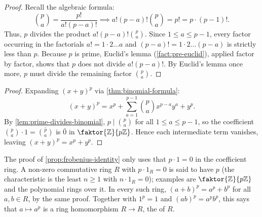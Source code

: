 \begin{content}

\begin{proof}
Recall the algebraic formula:
\[
\binom{p}{a} = \frac{p!}{a! (p-a)!} \implies a! (p-a)! \binom{p}{a} = p! = p \cdot (p-1)!.
\]
Thus, $p$ divides the product $a! (p-a)! \binom{p}{a}$. Since $1 \le a \le p-1$, every factor occurring in the factorials $a! = 1 \cdot 2 \dots a$ and $(p-a)! = 1 \cdot 2 \dots (p-a)$ is strictly less than $p$. Because $p$ is prime, Euclid's lemma (\cref{fact:pre-euclid}), applied factor by factor, shows that $p$ does not divide $a! (p-a)!$. By Euclid's lemma once more, $p$ must divide the remaining factor $\binom{p}{a}$.
\end{proof}


\begin{proof}
Expanding $(x + y)^p$ via \cref{thm:binomial-formula}:
\[
(x + y)^p = x^p + \sum_{a=1}^{p-1} \binom{p}{a} x^{p-a} y^a + y^p.
\]
By \cref{lem:prime-divides-binomial}, $p \mid \binom{p}{a}$ for all $1 \le a \le p-1$, so the coefficient $\binom{p}{a} \cdot 1 = \overline{\binom{p}{a}}$ is $\bar{0}$ in $\faktor{\mathbb{Z}}{p\mathbb{Z}}$. Hence each intermediate term vanishes, leaving $(x + y)^p = x^p + y^p$.
\end{proof}
\end{content}

\begin{aiNote}
The proof of \cref{prop:frobenius-identity} only uses that $p \cdot 1 = 0$ in the coefficient ring. A non-zero commutative ring $R$ with $p \cdot 1_R = 0$ is said to have  $p$ (the characteristic is the least $n \ge 1$ with $n \cdot 1_R = 0$); examples are $\faktor{\mathbb{Z}}{p\mathbb{Z}}$ and the polynomial rings over it. In every such ring, $(a + b)^p = a^p + b^p$ for all $a, b \in R$, by the same proof. Together with $1^p = 1$ and $(ab)^p = a^p b^p$, this says that $a \mapsto a^p$ is a ring homomorphism $R \to R$, the  of $R$.
\end{aiNote}

